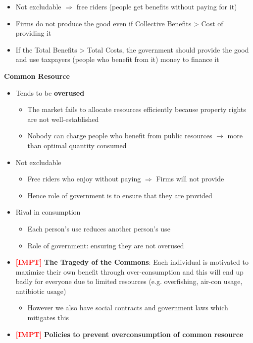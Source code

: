 \documentclass{article}
\newcommand{\impt}[0]{\textcolor{red}{\textbf{[IMPT] }}}
\begin{document}
\begin{multicols}{2}
\begin{itemize}
\begin{itemize}
	\end{itemize}
	\item Not excludable $\Rightarrow$ free riders (people get benefits without paying for it)
	\item Firms do not produce the good even if Collective Benefits > Cost of providing it
	\item If the Total Benefits > Total Costs, the government should provide the good and use taxpayers (people who benefit from it) money to finance it
\end{itemize}
\textbf{Common Resource}
\begin{itemize}
	\item Tends to be \textbf{overused}
	\begin{itemize}
		\item The market fails to allocate resources efficiently because property rights are not well-established
		\item Nobody can charge people who benefit from public resources $\rightarrow$ more than optimal quantity consumed
	\end{itemize}
	\item Not excludable
	\begin{itemize}
		\item Free riders who enjoy without paying $\Rightarrow$ Firms will not provide
		\item Hence role of government is to ensure that they are provided
	\end{itemize}
    \item Rival in consumption
    \begin{itemize}
    	\item Each person's use reduces another person's use
    	\item Role of government: ensuring they are not overused
    \end{itemize}
    \item \impt \textbf{The Tragedy of the Commons}: Each individual is motivated to maximize their own benefit through over-consumption and this will end up badly for everyone due to limited resources (e.g. overfishing, air-con usage, antibiotic usage)
    \begin{itemize}
    	\item However we also have social contracts and government laws which mitigates this
    \end{itemize}
    \item \impt \textbf{Policies to prevent overconsumption of common resource}
    \begin{itemize}

\end{itemize}
\end{itemize}
\end{multicols}
\end{document}
